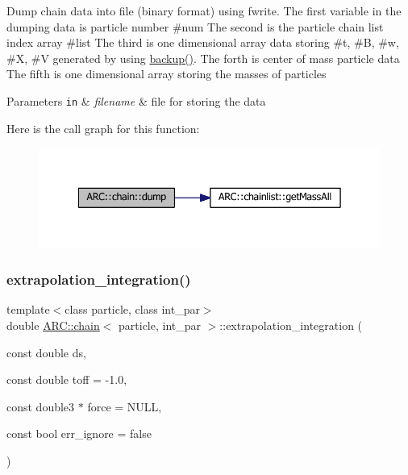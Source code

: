 Dump chain data into file (binary format) using fwrite. The first variable in the dumping data is particle number \#num The second is the particle chain list index array \#list The third is one dimensional array data storing \#t, \#B, \#w, \#X, \#V generated by using \hyperlink{classARC_1_1chain_ad098493cd057ac19786f5bc85f9ab25d}{backup()}. The forth is center of mass particle data The fifth is one dimensional array storing the masses of particles 
\begin{DoxyParams}[1]{Parameters}
\mbox{\tt in}  & {\em filename} & file for storing the data \\
\hline
\end{DoxyParams}
Here is the call graph for this function\+:
\nopagebreak
\begin{figure}[H]
\begin{center}
\leavevmode
\includegraphics[width=342pt]{classARC_1_1chain_a6b7202e64c0a4f5d4f3f8a31f9d27e20_cgraph}
\end{center}
\end{figure}
\hypertarget{classARC_1_1chain_ae4d0002cceee2397101a43b3755f927e}{}\label{classARC_1_1chain_ae4d0002cceee2397101a43b3755f927e} 
\subsubsection{\texorpdfstring{extrapolation\+\_\+integration()}{extrapolation\_integration()}}
{\footnotesize\ttfamily template$<$class particle, class int\+\_\+par$>$ \\
double \hyperlink{classARC_1_1chain}{A\+R\+C\+::chain}$<$ particle, int\+\_\+par $>$\+::extrapolation\+\_\+integration (\begin{DoxyParamCaption}\item[{const double}]{ds,  }\item[{const double}]{toff = {\ttfamily -\/1.0},  }\item[{const double3 $\ast$}]{force = {\ttfamily NULL},  }\item[{const bool}]{err\+\_\+ignore = {\ttfamily false} }\end{DoxyParamCaption})\hspace{0.3cm}{\ttfamily [inline]}}



